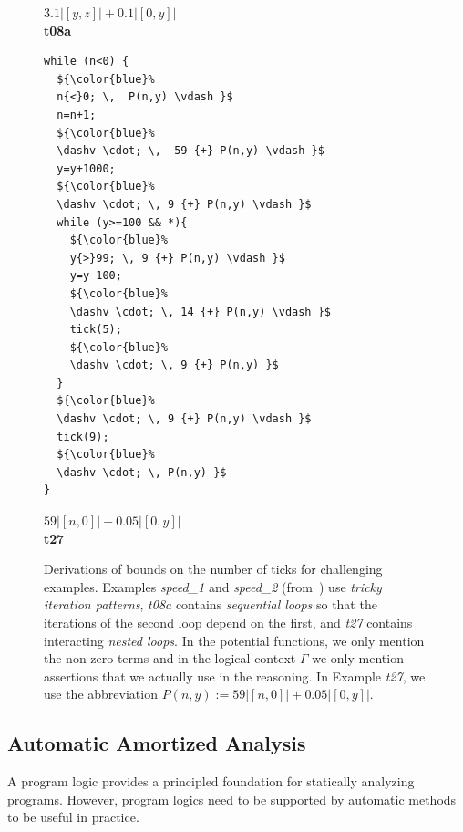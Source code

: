 \documentclass[nocopyrightspace,preprint]{sigplanconf}
\begin{document}
\begin{figure}[t!]
\begin{minipage}[b]{\progwidth}
\begin{center}
$3.1|[y,z]| + 0.1|[0,y]|$
\\[.4\baselineskip]
      {\bf t08a}
    \end{center}
  \end{minipage}
%
\hfill
%
%
%
  \begin{minipage}[b]{\progwidth}
    \begin{center}
   \begin{lstlisting}
while (n<0) {
  ${\color{blue}%
  n{<}0; \,  P(n,y) \vdash }$
  n=n+1;
  ${\color{blue}%
  \dashv \cdot; \,  59 {+} P(n,y) \vdash }$
  y=y+1000;
  ${\color{blue}%
  \dashv \cdot; \, 9 {+} P(n,y) \vdash }$
  while (y>=100 && *){
    ${\color{blue}%
    y{>}99; \, 9 {+} P(n,y) \vdash }$
    y=y-100;
    ${\color{blue}%
    \dashv \cdot; \, 14 {+} P(n,y) \vdash }$
    tick(5);
    ${\color{blue}%
    \dashv \cdot; \, 9 {+} P(n,y) }$
  }
  ${\color{blue}%
  \dashv \cdot; \, 9 {+} P(n,y) \vdash }$
  tick(9);
  ${\color{blue}%
  \dashv \cdot; \, P(n,y) }$
}
   \end{lstlisting}
$59|[n,0]| {+} 0.05|[0,y]|$
\\[.4\baselineskip]
      {\bf t27}
    \end{center}
  \end{minipage}
\vspace{1ex}
\caption{Derivations of bounds on the number of ticks for challenging
  examples.  Examples \emph{speed\_1} and \emph{speed\_2}
  (from~\cite{GulwaniMC09}) use \emph{tricky iteration patterns},
  \emph{t08a} contains \emph{sequential loops} so that the iterations
  of the second loop depend on the first, and \emph{t27} contains
  interacting \emph{nested loops}. In the potential functions, we only
  mention the non-zero terms and in the logical context $\Gamma$ we
  only mention assertions that we actually use in the reasoning. In
  Example \emph{t27}, we use the abbreviation $P(n,y) := 59|[n,0]| {+}
  0.05|[0,y]|$.}
  \label{fig:ex_list}
\end{figure}
%
%

\subsection{Automatic Amortized Analysis}

A program logic provides a principled foundation for statically
analyzing programs.  However, program logics need to be supported by
automatic methods to be useful in practice.  %
\end{document}
